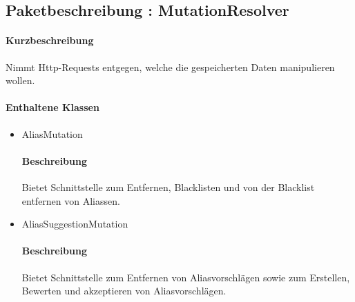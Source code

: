 \subsection{Paketbeschreibung : MutationResolver}%
\paragraph*{Kurzbeschreibung}
Nimmt Http-Requests entgegen, welche die gespeicherten Daten manipulieren wollen.
\paragraph*{Enthaltene Klassen}
\begin{itemize}
    \item AliasMutation
    		\paragraph*{Beschreibung}
            Bietet Schnittstelle zum Entfernen, Blacklisten und von der Blacklist entfernen von Aliassen.
    \item AliasSuggestionMutation
    		\paragraph*{Beschreibung}
    		Bietet Schnittstelle zum Entfernen von Aliasvorschlägen sowie zum Erstellen, Bewerten und akzeptieren von Aliasvorschlägen.
\end{itemize}